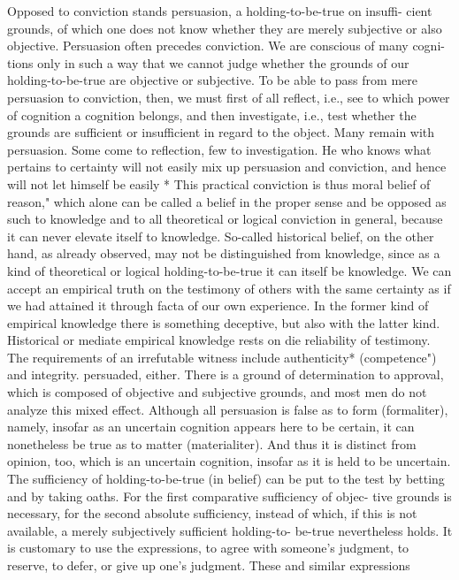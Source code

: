 Opposed to conviction stands persuasion, a holding-to-be-true on insuffi-
cient grounds, of which one does not know whether they are merely
subjective or also objective.
Persuasion often precedes conviction. We are conscious of many cogni-
tions only in such a way that we cannot judge whether the grounds of our
holding-to-be-true are objective or subjective. To be able to pass from
mere persuasion to conviction, then, we must first of all reflect, i.e., see to
which power of cognition a cognition belongs, and then investigate, i.e.,
test whether the grounds are sufficient or insufficient in regard to the
object. Many remain with persuasion. Some come to reflection, few to
investigation. He who knows what pertains to certainty will not easily mix
up persuasion and conviction, and hence will not let himself be easily
* This practical conviction is thus moral belief of reason," which alone can be called a belief in
the proper sense and be opposed as such to knowledge and to all theoretical or logical
conviction in general, because it can never elevate itself to knowledge. So-called historical
belief, on the other hand, as already observed, may not be distinguished from knowledge,
since as a kind of theoretical or logical holding-to-be-true it can itself be knowledge. We can
accept an empirical truth on the testimony of others with the same certainty as if we had
attained it through facta of our own experience. In the former kind of empirical knowledge
there is something deceptive, but also with the latter kind.
Historical or mediate empirical knowledge rests on die reliability of testimony. The
requirements of an irrefutable witness include authenticity* (competence") and integrity.
persuaded, either. There is a ground of determination to approval, which
is composed of objective and subjective grounds, and most men do not
analyze this mixed effect.
Although all persuasion is false as to form (formaliter), namely, insofar
as an uncertain cognition appears here to be certain, it can nonetheless be
true as to matter (materialiter). And thus it is distinct from opinion, too,
which is an uncertain cognition, insofar as it is held to be uncertain.
The sufficiency of holding-to-be-true (in belief) can be put to the test
by betting and by taking oaths. For the first comparative sufficiency of objec-
tive grounds is necessary, for the second absolute sufficiency, instead of
which, if this is not available, a merely subjectively sufficient holding-to-
be-true nevertheless holds.
It is customary to use the expressions, to agree with someone's judgment, to
reserve, to defer, or give up one's judgment. These and similar expressions
